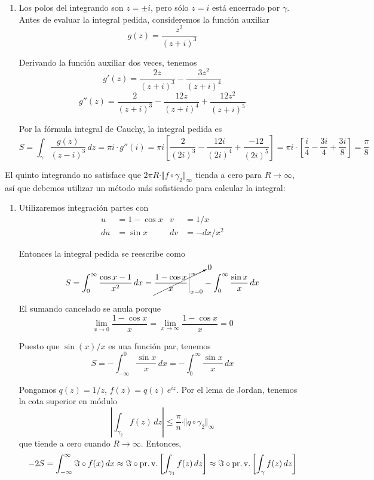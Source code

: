 \begin{solution}
\begin{enumerate}[label=(\alph*)]
    \item Los polos del integrando son $z = \pm i$, pero sólo $z = i$ está encerrado por $\gamma$. Antes de evaluar la integral pedida, consideremos la función auxiliar
    $$g(z) = \frac {z^2} {(z+i)^3}$$
    
    Derivando la función auxiliar dos veces, tenemos
    $$g'(z) = \frac {2z} {(z+i)^3} - \frac {3z^2} {(z+i)^4}$$
    $$g''(z) = \frac 2 {(z+i)^3} - \frac {12z} {(z+i)^4} + \frac {12z^2} {(z+i)^5}$$
    
    Por la fórmula integral de Cauchy, la integral pedida es
    $$
    S
        = \int_\gamma \frac {g(z)} {(z-i)^3} \, dz = \pi i \cdot g''(i)
        = \pi i \left[ \frac 2 {(2i)^3} - \frac {12i} {(2i)^4} + \frac {-12} {(2i)^5} \right]
        = \pi i \cdot \left[ \frac i4 - \frac {3i} 4 + \frac {3i} 8 \right]
        = \frac \pi 8
    $$
\end{enumerate}
El quinto integrando no satisface que $2\pi R \cdot \Vert f \circ \gamma_2 \Vert_\infty$ tienda a cero para $R \to \infty$, así que debemos utilizar un método más sofisticado para calcular la integral:
\begin{enumerate}[label=(\alph*)]
    \setcounter {enumi} 4
    
    \item Utilizaremos integración partes con
    \begin{align*}
        u &= 1 - \cos x & v &= 1/x \\
        du &= \sin x & dv &= -dx/x^2
    \end{align*}
    
    Entonces la integral pedida se reescribe como
    $$
    S
        = \int_0^\infty \frac {\cos x - 1} {x^2} \, dx
        = \cancelto 0 {\frac {1 - \cos x} x \bigg \vert_{x=0}^\infty}
            -\int_0^\infty \frac {\sin x} x \, dx
    $$
    
    El sumando cancelado se anula porque
    $$\lim_{x \to 0} \frac {1 - \cos x} x = \lim_{x \to \infty} \frac {1 - \cos x} x = 0$$
    
    Puesto que $\sin(x)/x$ es una función par, tenemos
    $$S = -\int_{-\infty}^0 \frac {\sin x} x \, dx = -\int_0^\infty \frac {\sin x} x \, dx$$
    
    Pongamos $q(z) = 1/z$, $f(z) = q(z) \, e^{iz}$. Por el lema de Jordan, tenemos la cota superior en módulo
    $$\left| \int_{\gamma_2} f(z) \, dz \right| \le \frac \pi n \cdot \Vert q \circ \gamma_2 \Vert_\infty$$
    que tiende a cero cuando $R \to \infty$. Entonces,
    $$
    -2S
        = \int_{-\infty}^\infty \Im \circ f(x) \, dx
        \approx \Im \circ \operatorname{pr.v.} \left[ \int_{\gamma_1} f(z) \, dz \right]
        \approx \Im \circ \operatorname{pr.v.} \left[ \int_\gamma f(z) \, dz \right]
    $$
    

\end{enumerate}
\end{solution}
